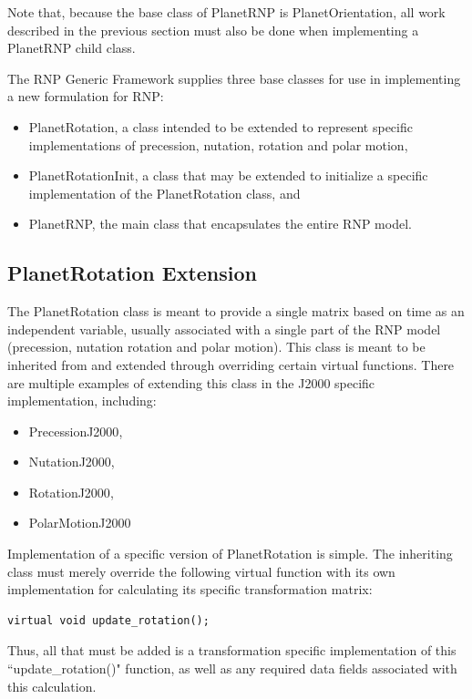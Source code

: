 Note that, because the base class of PlanetRNP is PlanetOrientation, all
work described in the previous section must also be done when implementing
a PlanetRNP child class.

The RNP Generic Framework supplies three base classes for use in implementing
a new formulation for RNP:

\begin{itemize}
\item{PlanetRotation}, a class intended to be extended to represent specific
implementations of precession, nutation, rotation and polar motion,
\item{PlanetRotationInit}, a class that may be extended to initialize
a specific implementation of the PlanetRotation class, and
\item{PlanetRNP}, the main class that encapsulates the entire RNP model.
\end{itemize}

\subsection{PlanetRotation Extension}

The PlanetRotation class is meant to provide a single matrix based on time as
an independent variable, usually associated with a single part of the RNP model
(precession, nutation rotation and polar motion). This class is meant to be
inherited from and extended through overriding certain virtual functions. There
are multiple examples of extending this class in the J2000 specific
implementation, including:

\begin{itemize}
\item{PrecessionJ2000},
\item{NutationJ2000},
\item{RotationJ2000},
\item{PolarMotionJ2000}
\end{itemize}

Implementation of a specific version of PlanetRotation is simple. The inheriting 
class must merely override the following virtual function with its own
implementation for calculating its specific transformation matrix:

\begin{verbatim}
virtual void update_rotation();
\end{verbatim}

Thus, all that must be added is a transformation specific implementation of
this ``update\_rotation()" function, as well as any required data fields
associated with this calculation.

